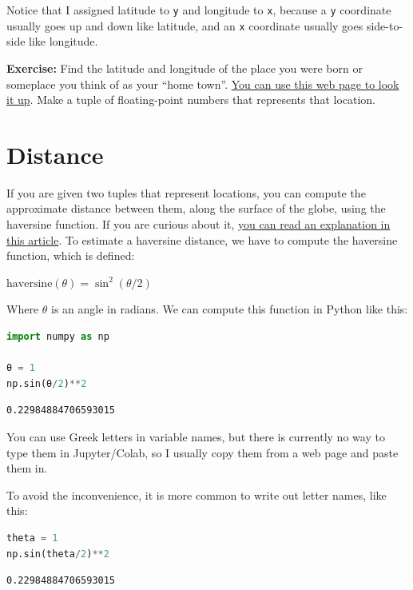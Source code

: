 Notice that I assigned latitude to \passthrough{\lstinline!y!} and
longitude to \passthrough{\lstinline!x!}, because a
\passthrough{\lstinline!y!} coordinate usually goes up and down like
latitude, and an \passthrough{\lstinline!x!} coordinate usually goes
side-to-side like longitude.

\textbf{Exercise:} Find the latitude and longitude of the place you were
born or someplace you think of as your ``home town''.
\href{https://www.latlong.net/}{You can use this web page to look it
up}. Make a tuple of floating-point numbers that represents that
location.

\hypertarget{distance}{%
\section{Distance}\label{distance}}

If you are given two tuples that represent locations, you can compute
the approximate distance between them, along the surface of the globe,
using the haversine function. If you are curious about it,
\href{https://janakiev.com/blog/gps-points-distance-python/}{you can
read an explanation in this article}. To estimate a haversine distance,
we have to compute the haversine function, which is defined:

\(\mathrm{haversine}(\theta)=\sin^2(\theta/2)\)

Where \(\theta\) is an angle in radians. We can compute this function in
Python like this:

\begin{lstlisting}[language=Python,style=source]
import numpy as np

θ = 1
np.sin(θ/2)**2
\end{lstlisting}

\begin{lstlisting}[style=output]
0.22984884706593015
\end{lstlisting}

You can use Greek letters in variable names, but there is currently no
way to type them in Jupyter/Colab, so I usually copy them from a web
page and paste them in.

To avoid the inconvenience, it is more common to write out letter names,
like this:

\begin{lstlisting}[language=Python,style=source]
theta = 1
np.sin(theta/2)**2
\end{lstlisting}

\begin{lstlisting}[style=output]
0.22984884706593015
\end{lstlisting}


